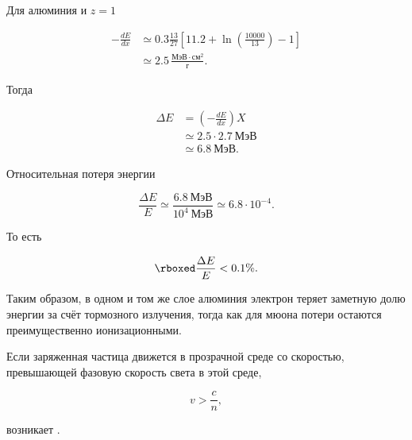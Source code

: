 \documentclass[../final.tex]{subfiles}
\begin{document}
Для алюминия и $z=1$

\begin{align*}
    -
    \frac{dE}{dx}
    &\simeq
    0.3
    \frac{13}{27}
    \left[
        11.2
        +
        \ln
        \left(
            \frac{10000}{13}
        \right)
        -
        1
    \right]
    \\[3pt]
    &\simeq
    2.5\,
    \frac{
        \text{МэВ}\cdot\text{см}^2
    }{
        \text{г}
    }.
\end{align*}

Тогда

\begin{align*}
    \Delta E
    &=
    \left(
        -
        \frac{dE}{dx}
    \right)X
    \\[3pt]
    &\simeq
    2.5\cdot2.7\ \text{МэВ}
    \\[3pt]
    &\simeq
    6.8\ \text{МэВ}.
\end{align*}


Относительная потеря энергии

\begin{equation*}
    \frac{\Delta E}{E}
    \simeq
    \frac{6.8\ \text{МэВ}}{10^4\ \text{МэВ}}
    \simeq
    6.8\cdot10^{-4}.
\end{equation*}

То есть

\begin{equation*}
    \rboxed{
        \frac{\Delta E}{E}
        <0.1\%
    }.
\end{equation*}

Таким образом, в одном и том же слое алюминия
электрон теряет заметную долю энергии за счёт
тормозного излучения, тогда как для мюона
потери остаются преимущественно ионизационными.




Если заряженная частица движется в прозрачной среде
со скоростью, превышающей фазовую скорость света в этой среде,

\begin{equation*}
    v>\frac{c}{n},
\end{equation*}

возникает .
\end{document}
